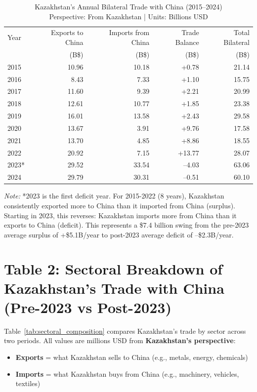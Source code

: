 \documentclass[12pt]{article}
\begin{document}
\begin{table}[H]
\centering
\small
\caption{Kazakhstan's Annual Bilateral Trade with China (2015--2024) \\
\small Perspective: From Kazakhstan | Units: Billions USD}
\label{tab:annual_trends}
\begin{tabular}{lrrrr}
\toprule
Year & Exports to China & Imports from China & Trade Balance & Total Bilateral \\
 & (B\$) & (B\$) & (B\$) & (B\$) \\
\midrule
2015 & 10.96 & 10.18 & +0.78 & 21.14 \\
2016 & 8.43 & 7.33 & +1.10 & 15.75 \\
2017 & 11.60 & 9.39 & +2.21 & 20.99 \\
2018 & 12.61 & 10.77 & +1.85 & 23.38 \\
2019 & 16.01 & 13.58 & +2.43 & 29.58 \\
2020 & 13.67 & 3.91 & +9.76 & 17.58 \\
2021 & 13.70 & 4.85 & +8.86 & 18.55 \\
2022 & 20.92 & 7.15 & +13.77 & 28.07 \\
2023* & 29.52 & 33.54 & --4.03 & 63.06 \\
2024 & 29.79 & 30.31 & --0.51 & 60.10 \\
\bottomrule
\end{tabular}
\footnotesize
\emph{Note:} *2023 is the first deficit year. For 2015-2022 (8 years), Kazakhstan consistently exported more to China than it imported from China (surplus). Starting in 2023, this reverses: Kazakhstan imports more from China than it exports to China (deficit). This represents a \$7.4 billion swing from the pre-2023 average surplus of +\$5.1B/year to post-2023 average deficit of --\$2.3B/year.
\end{table}

\section{Table 2: Sectoral Breakdown of Kazakhstan's Trade with China (Pre-2023 vs Post-2023)}

Table~\ref{tab:sectoral_composition} compares Kazakhstan's trade by sector across two periods. All values are millions USD from \textbf{Kazakhstan's perspective}:
\begin{itemize}
\item \textbf{Exports} = what Kazakhstan sells to China (e.g., metals, energy, chemicals)
\item \textbf{Imports} = what Kazakhstan buys from China (e.g., machinery, vehicles, textiles)
\end{itemize}
\end{document}
